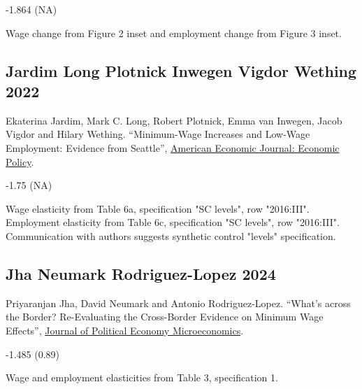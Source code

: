 \vspace{0.7em}

 -1.864 (NA)

\vspace{0.7em}

 Wage change from Figure 2 inset and employment change from Figure 3 inset.

\subsection*{Jardim Long Plotnick Inwegen Vigdor Wething 2022}
\vspace{-0.7em}

\noindent Ekaterina Jardim, Mark C. Long, Robert Plotnick, Emma van Inwegen, Jacob Vigdor and Hilary Wething. ``Minimum-Wage Increases and Low-Wage Employment: Evidence from Seattle'', \href{https://doi.org/10.1257/pol.20180578}{American Economic Journal: Economic Policy}.

\vspace{0.7em}

 -1.75 (NA)

\vspace{0.7em}

 Wage elasticity from Table 6a, specification "SC levels", row "2016:III". Employment elasticity from Table 6c, specification "SC levels", row "2016:III". Communication with authors suggests synthetic control "levels" specification.

\subsection*{Jha Neumark Rodriguez-Lopez 2024}
\vspace{-0.7em}

\noindent Priyaranjan Jha, David Neumark and Antonio Rodriguez-Lopez. ``What's across the Border? Re-Evaluating the Cross-Border Evidence on Minimum Wage Effects'', \href{https://sites.socsci.uci.edu/~jantonio/Papers/minwage_czones.pdf}{Journal of Political Economy Microeconomics}.

\vspace{0.7em}

 -1.485 (0.89)

\vspace{0.7em}

 Wage and employment elasticities from Table 3, specification 1.

